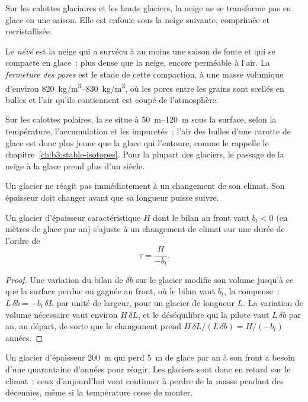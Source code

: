 Sur les calottes glaciaires et les hauts glaciers, la neige ne se transforme pas en glace
en une saison. Elle est enfouie sous la neige suivante, comprimée et recristallisée.

\begin{definition}\label{def:b3:glaciology:firn}
Le \emph{névé} est la neige qui a survécu à au moins une saison de fonte
et qui se compacte en glace~: plus dense que la neige, encore perméable à l'air.
La \emph{fermeture des pores} est le stade de cette compaction,
à une masse volumique d'environ \qtyrange{820}{830}{kg/m^3}, où les pores entre les grains
sont scellés en bulles et l'air qu'ils contiennent est coupé de
l'atmosphère.
\end{definition}

Sur les calottes polaires, la  se situe à \qtyrange{50}{120}{m} sous la
surface, selon la température, l'accumulation et les impuretés~;
l'air des bulles d'une carotte de glace est donc plus jeune que la glace qui l'entoure,
comme le rappelle le chapitre~\ref{ch:b3:stable-isotopes}. Pour la plupart des glaciers,
le passage de la neige à la glace prend plus d'un siècle.

Un glacier ne réagit pas immédiatement à un changement de son climat. Son épaisseur doit
changer avant que sa longueur puisse suivre.

\begin{proposition}\label{prop:b3:glaciology:response}
Un glacier d'épaisseur caractéristique $H$ dont le bilan au front vaut $b_t <
0$ (en mètres de glace par an) s'ajuste à un changement de climat sur une durée
de l'ordre de
\[
\tau = \frac{H}{-b_t} .
\]
\end{proposition}

\begin{proof}
Une variation du bilan de $\delta b$ sur le glacier modifie son volume
jusqu'à ce que la surface perdue ou gagnée au front, où le bilan vaut $b_t$,
la compense~: $L\,\delta b = -b_t\,\delta L$ par unité de largeur, pour un
glacier de longueur $L$. La variation de volume nécessaire vaut environ $H\,\delta L$, et
le déséquilibre qui la pilote vaut $L\,\delta b$ par an, au départ, de sorte que le
changement prend $H\,\delta L/(L\,\delta b) = H/(-b_t)$ années.
\end{proof}

Un glacier d'épaisseur \qty{200}{m} qui perd \qty{5}{m} de glace par an à son front a
besoin d'une quarantaine d'années pour réagir. Les glaciers sont donc en retard sur le
climat~: ceux d'aujourd'hui vont continuer à perdre de la masse pendant des décennies,
même si la température cesse de monter.

